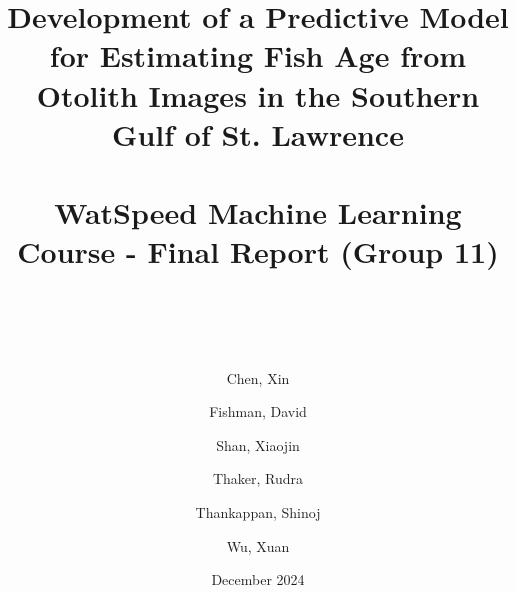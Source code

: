 \title{
    Development of a Predictive Model for Estimating Fish Age from Otolith Images in the Southern Gulf of St. Lawrence \\~\\
    \large WatSpeed Machine Learning Course - Final Report (Group 11) \\~\\~\\
}


\date{December 2024}

\author[1]{Chen, Xin}
\author[2]{Fishman, David}
\author[3]{Shan, Xiaojin}
\author[4]{Thaker, Rudra}
\author[5]{Thankappan, Shinoj}
\author[6]{Wu, Xuan}

{
    \makeatletter
    \renewcommand\AB@affilsepx{: \protect\Affilfont}
    \makeatother


    \makeatletter
    \renewcommand\AB@affilsepx{, \protect\Affilfont}
    \makeatother

}

\maketitle
